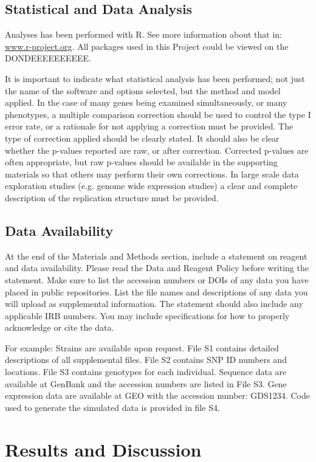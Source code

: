 \documentclass[9pt,twocolumn,twoside]{gsajnl}
\begin{document}
\subsection*{Statistical and Data Analysis } 
Analyses has been performed with R. See more information about that in: \url{www.r-project.org}. All packages used in this Project could be viewed on the DONDEEEEEEEEEE.


It is important to indicate what statistical analysis has been performed; not just the name of the software and options selected, but the method and model applied. In the case of many genes being examined simultaneously, or many phenotypes, a multiple comparison correction should be used to control the type I error rate, or a rationale for not applying a correction must be provided. The type of correction applied should be clearly stated. It should also be clear whether the p-values reported are raw, or after correction. Corrected p-values are often appropriate, but raw p-values should be available in the supporting materials so that others may perform their own corrections. In large scale data exploration studies (e.g. genome wide expression studies) a clear and complete description of the replication structure must be provided. 

\subsection*{Data Availability}

At the end of the Materials and Methods section, include a statement on reagent and data availability. Please read the Data and Reagent Policy before writing the statement. Make sure to list the accession numbers or DOIs of any data you have placed in public repositories. List the file names and descriptions of any data you will upload as supplemental information. The statement should also include any applicable IRB numbers. You may include specifications for how to properly acknowledge or cite the data.

For example: Strains are available upon request. File S1 contains detailed descriptions of all supplemental files. File S2 contains SNP ID numbers and locations. File S3 contains genotypes for each individual. Sequence data are available at GenBank and the accession numbers are listed in File S3. Gene expression data are available at GEO with the accession number: GDS1234. Code used to generate the simulated data is provided in file S4. 


\section*{Results and Discussion}
\end{document}
